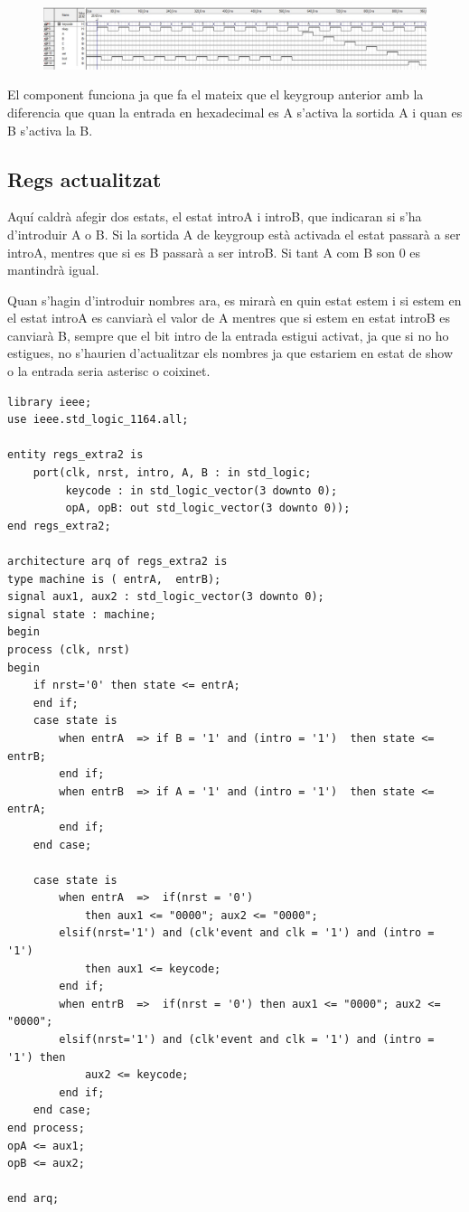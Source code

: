 \documentclass[12pt, a4papre]{article}
\begin{document}
	\begin{figure}[H]
		\begin{center}
		\includegraphics[width=130mm]{SimKCex.jpeg}
		\end{center}
	\end{figure}
	
	El component funciona ja que fa el mateix que el keygroup anterior amb la diferencia que quan la entrada en hexadecimal es A s'activa la sortida A i quan es B s'activa la B.
	
	\subsection{Regs actualitzat}
	
	Aquí caldrà afegir dos estats, el estat introA i introB, que indicaran si s'ha d'introduir A o B. Si la sortida A de keygroup està activada el estat passarà a ser introA, mentres que si es B passarà a ser introB. Si tant A com B son 0 es mantindrà igual. 
	
	Quan s'hagin d'introduir nombres ara, es mirarà en quin estat estem i si estem en el estat introA es canviarà el valor de A mentres que si estem en estat introB es canviarà B, sempre que el bit intro de la entrada estigui activat, ja que si no ho estigues, no s'haurien d'actualitzar els nombres ja que estariem en estat de show o la entrada seria asterisc o coixinet.
	
		\begin{lstlisting}[style=vhdl, frame=single, basicstyle=\tiny]
library ieee;
use ieee.std_logic_1164.all;

entity regs_extra2 is
	port(clk, nrst, intro, A, B : in std_logic;
		 keycode : in std_logic_vector(3 downto 0);
		 opA, opB: out std_logic_vector(3 downto 0));
end regs_extra2;

architecture arq of regs_extra2 is
type machine is ( entrA,  entrB);
signal aux1, aux2 : std_logic_vector(3 downto 0);
signal state : machine;
begin
process (clk, nrst)
begin 
	if nrst='0' then state <= entrA;
	end if;
	case state is
	    when entrA  => if B = '1' and (intro = '1')  then state <= entrB; 
	    end if;
	    when entrB  => if A = '1' and (intro = '1')  then state <= entrA; 
	    end if;
	end case;
	
	case state is
	    when entrA  =>  if(nrst = '0') 
			then aux1 <= "0000"; aux2 <= "0000";
		elsif(nrst='1') and (clk'event and clk = '1') and (intro = '1') 
			then aux1 <= keycode;
		end if;
	    when entrB  =>  if(nrst = '0') then aux1 <= "0000"; aux2 <= "0000";
		elsif(nrst='1') and (clk'event and clk = '1') and (intro = '1') then
			aux2 <= keycode;
		end if;
	end case;
end process;
opA <= aux1;
opB <= aux2;

end arq;
\end{lstlisting}
	
\end{document}
